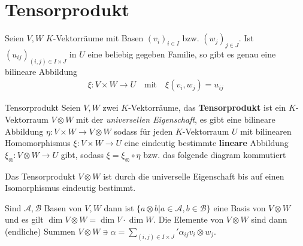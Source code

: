 
\section{Tensorprodukt}

Seien $V, W$ $K$-Vektorräume mit Basen $(v_i)_{i\in I}$ bzw. $(w_j)_{j \in J}$. Ist $(u_{ij})_{(i,j) \in I \times J}$ in $U$ eine beliebig gegeben Familie, so gibt es genau eine bilineare Abbildung
\begin{align*}
    \xi: V \times W \to U \quad \text{mit} \quad \xi(v_i,w_j) = u_{ij}
\end{align*}

\begin{definition}{Tensorprodukt}
    Seien $V,W$ zwei $K$-Vektorräume, das \textbf{Tensorprodukt} ist ein $K$-Vektorraum $V \otimes W$ mit der \emph{universellen Eigenschaft}, es gibt eine bilineare Abbildung $\eta: V \times W \to V \otimes W$ sodass für jeden $K$-Vektorraum $U$ mit bilinearen Homomorphismus $\xi: V \times W \to U$ eine eindeutig bestimmte \textbf{lineare} Abbildung $\xi_{\otimes}: V \otimes W \to U$ gibt, sodass $\xi = \xi_{\otimes} \circ \eta$ bzw. das folgende diagram kommutiert
    \begin{center}
    \end{center}
    Das Tensorprodukt $V \otimes W$ ist durch die universelle Eigenschaft bis auf einen Isomorphismus eindeutig bestimmt.
\end{definition}
Sind $\mathcal{A}, \mathcal{B}$ Basen von $V,W$ dann ist $\{a \otimes b \big\vert a \in \mathcal{A}, b \in \mathcal{B}\}$
eine Basis von $V \otimes W$ und es gilt $\dim V \otimes W = \dim V \cdot \dim W$. Die Elemente von $V \otimes W$ sind dann (endliche) Summen $V \otimes W \ni \alpha = \sum_{(i,j) \in I \times J}' \alpha_{ij} v_i \otimes w_j$.


